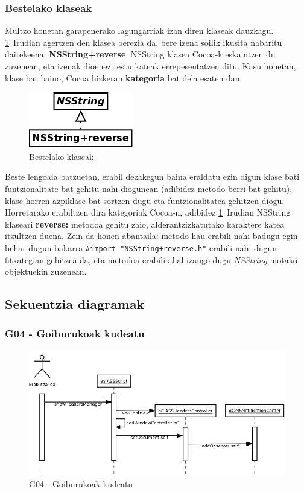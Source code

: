 \subsubsection{Bestelako klaseak}
Multzo honetan garapenerako lagungarriak izan diren klaseak dauzkagu. \ref{kd-others}~Irudian agertzen den klasea berezia da, bere izena soilik ikusita nabaritu daitekeena: \textbf{NSString+reverse}. NSString klasea Cocoa-k eskaintzen du zuzenean, eta izenak dioenez testu kateak errepesentatzen ditu. Kasu honetan, klase bat baino, Cocoa hizkeran \textbf{kategoria} bat dela esaten dan.
\begin{figure}[htp]
\begin{center}
\includegraphics[scale=0.4]{Pictures/Chapter4/Diseinua/KD-Others.png}
\caption{Bestelako klaseak}
\label{kd-others}
\end{center}
\end{figure}
Beste lengoaia batzuetan, erabil dezakegun baina eraldatu ezin digun klase bati funtzionalitate bat gehitu nahi diogunean (adibidez metodo berri bat gehitu), klase horren azpiklase bat sortzen dugu eta funtzionalitatea gehitzen diogu. Horretarako erabiltzen dira kategoriak Cocoa-n, adibidez \ref{kd-others}~Irudian NSString klaseari \textbf{reverse:} metodoa gehitu zaio, alderantzizkatutako karaktere katea itzultzen duena. Zein da honen abantaila: metodo hau erabili nahi badugu egin behar dugun bakarra \texttt{\#import "NSString+reverse.h"} erabili nahi dugun fitxategian gehitzea da, eta metodoa erabili ahal izango dugu \textit{NSString} motako objektuekin zuzenean.

\newpage
\subsection{Sekuentzia diagramak}

\subsubsection{G04 - Goiburukoak kudeatu}
\begin{figure}[htp]
\begin{center}
\includegraphics[scale=0.35]{Pictures/Chapter4/Diseinua/G04.png}
\caption{G04 - Goiburukoak kudeatu}
\label{g04d}
\end{center}
\end{figure}

